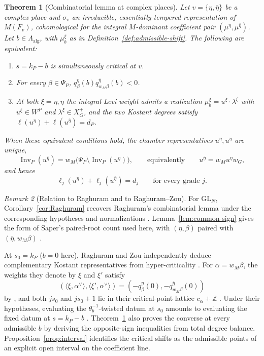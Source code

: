 \documentclass[12pt]{amsart}
\numberwithin{equation}{section}
\theoremstyle{plain}
\newtheorem{theorem}{Theorem}[section]
\theoremstyle{definition}
\theoremstyle{remark}
\newtheorem{remark}[theorem]{Remark}
\renewcommand{\bar}{\overline}
\newcommand{\GL}{\mathrm{GL}}
\newcommand{\Z}{\mathbb{Z}}
\DeclareMathOperator{\Inv}{Inv}
\begin{document}
\begin{theorem}[Combinatorial lemma at complex places] \label{thm:complex}
Let $v=\{\eta,\bar\eta\}$ be a complex place and $\sigma_v$ an irreducible, essentially tempered representation of $M(F_v)$, cohomological for the integral $M$-dominant coefficient pair $(\mu^\eta,\mu^{\bar\eta})$. Let $b\in\Lambda_{\mathrm{alg}}$, with
$\mu_b^\xi$ as in Definition~\ref{def:admissible-shift}. The following are equivalent:
\begin{enumerate}
\item $s=k_P-b$ is simultaneously critical at $v$.
\item For every $\beta\in\Psi_P$, $q^\eta_\beta(b)q^{\bar\eta}_{w_M\beta}(b)<0$.
\item At both $\xi=\eta,\bar\eta$ the integral Levi weight admits a realization $\mu_b^\xi=u^\xi\cdot\lambda^\xi$ with $u^\xi\in W^P$ and $\lambda^\xi\in X_G^+$, and the two Kostant degrees satisfy $\ell(u^\eta)+\ell(u^{\bar\eta})=d_P$.
\end{enumerate}
When these equivalent conditions hold, the chamber representatives $u^\eta,u^{\bar\eta}$ are unique,
\begin{equation}\label{eq:complementary-inversions}
 \Inv_P(u^{\bar\eta})
     =w_M\bigl(\Psi_P\setminus\Inv_P(u^\eta)\bigr),
 \qquad\text{equivalently}\qquad
 u^{\bar\eta}=w_Mu^\eta w_G,
\end{equation}
and hence
\begin{equation}\label{eq:graded-balance}
 \ell_j(u^\eta)+\ell_j(u^{\bar\eta})=d_j
                       \qquad\text{for every grade }j.
\end{equation}
\end{theorem}

\begin{remark}[Relation to Raghuram and to Raghuram--Zou] \label{rem:complex-attribution}
For $\GL_N$, Corollary~\ref{cor:Raghuram} recovers Raghuram's combinatorial lemma under the corresponding hypotheses and normalizations \cite[Lemma~3.16]{Raghuram2025}. Lemma~\ref{lem:common-sign} gives the form of Saper's paired-root count used here, with $(\eta,\beta)$ paired with $(\bar\eta,w_M\beta)$ \cite[Lemmas~8.7(iii) and~17.6]{SaperMicro}.

At $s_0=k_P$ ($b=0$ here), Raghuram and Zou independently deduce complementary Kostant representatives from hyper-criticality \cite[Lemma~7.15 and (7.17)--(7.18)]{RaghuramZou2026}. For $\alpha=w_M\beta$, the weights they denote by $\xi$ and $\xi'$ satisfy
\[
 (\langle\xi,\alpha^\vee\rangle,\langle\xi',\alpha^\vee\rangle)
 =(-q^\eta_\beta(0),-q^{\bar\eta}_{w_M\beta}(0))
\]
by \cite[(7.7), (7.9)--(7.13)]{RaghuramZou2026}, and both $js_0$ and $js_0+1$ lie in their critical-point lattice $c_\alpha+\Z$ \cite[Def.~5.8 and (7.14)]{RaghuramZou2026}. Under their hypotheses, evaluating the $\theta_b^{-1}$-twisted datum at $s_0$ amounts to evaluating the fixed datum at $s=k_P-b$ \cite[(5.6)]{RaghuramZou2026}. Theorem~\ref{thm:complex} also proves the converse at every admissible $b$ by deriving the opposite-sign inequalities from total degree balance. Proposition~\ref{prop:interval} identifies the critical shifts as the admissible points of an explicit open interval on the coefficient line. 
\end{remark}
\end{document}
